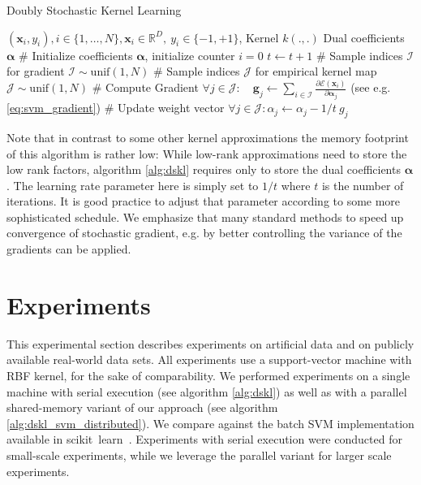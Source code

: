 \documentclass{article} %
\newcommand{\R}{\ensuremath{\mathds{R}}}
\newcommand{\va}{\boldsymbol{\alpha}}
\newcommand{\Bx}{\mathbf{x}}
\renewcommand{\vec}[1]{\mathbf{#1}}
\begin{document}
% 
\begin{algorithm}
  \begin{algorithmic}
    \caption{Doubly Stochastic Kernel Learning\label{alg:dskl}}
     \REQUIRE $(\Bx_i,y_i),i\in\{1,\dots,N\},\Bx_i\in\R^{D},~y_i\in\{-1,+1\}$, Kernel $k(.,.)$
    \ENSURE Dual coefficients $\va$ 
   \STATE \# Initialize coefficients $\va$, initialize counter $i=0$
   \STATE $t\gets t+1$
   \STATE \# Sample indices $\mathcal{I}$ for gradient 
   \STATE $\mathcal{I}\sim\text{unif}(1,N)$
   \STATE \# Sample indices $\mathcal{J}$ for empirical kernel map
   \STATE $\mathcal{J}\sim\text{unif}(1,N)$
   \STATE \# Compute Gradient
   \STATE $\forall j \in \mathcal{J}: \quad \vec{g}_{j} \gets \sum_{i\in\mathcal{I}}\frac{\partial \mathcal{E}(\vec{x}_i)}{\partial\va_{j}}$  (see e.g. \autoref{eq:svm_gradient})
   \STATE \# Update weight vector 
   \STATE $\forall j\in\mathcal{J}: \alpha_j\gets\alpha_j - 1/t~ g_j$ 
   \ENDWHILE
  \end{algorithmic}
\end{algorithm}
%
Note that in contrast to some other kernel approximations the memory footprint of this algorithm is rather low: While low-rank approximations need to store the low rank factors, algorithm \autoref{alg:dskl} requires only to store the dual coefficients $\va$. 
The learning rate parameter here is simply set to $1/t$ where $t$ is the number of iterations. It is good practice to adjust that parameter according to some more sophisticated schedule. We emphasize that many standard methods to speed up convergence of stochastic gradient, e.g. by better controlling the variance of the gradients can be applied.
%
\section{Experiments}\label{sec:experiments}
This experimental section describes experiments on artificial data and on publicly available real-world data sets. All experiments use a support-vector machine with RBF kernel, for the sake of comparability. We performed experiments on a single machine with serial execution (see algorithm \autoref{alg:dskl}) as well as with a parallel shared-memory variant of our approach (see algorithm \autoref{alg:dskl_svm_distributed}). We compare against the batch SVM implementation available in scikit~learn~\cite{sklearn_api}. Experiments with serial execution were conducted for small-scale experiments, while we leverage the parallel variant for larger scale experiments. 
\end{document}
